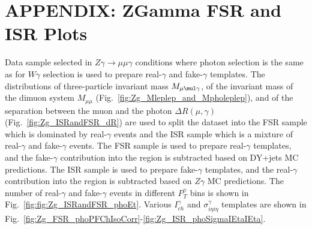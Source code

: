 \section{APPENDIX: ZGamma FSR and ISR Plots}
\label{sec:ZgFSRandISRplots}

Data sample selected in $Z\gamma\rightarrow\mu\mu\gamma$ conditions where photon selection is the same as for $W\gamma$ selection is used to prepare real-$\gamma$ and fake-$\gamma$ templates. The distributions of three-particle invariant mass $M_{\mu\mul\gamma}$, of the invariant mass of the dimuon system $M_{\mu\mu}$ (Fig.~\ref{fig:Zg_Mleplep_and_Mpholeplep}), and of the separation between the muon and the photon $\Delta R(\mu,\gamma)$ (Fig.~\ref{fig:Zg_ISRandFSR_dR}) are used to split the dataset into the FSR sample which is dominated by real-$\gamma$ events and the ISR sample which is a mixture of real-$\gamma$ and fake-$\gamma$ events. The FSR sample is used to prepare real-$\gamma$ templates, and the fake-$\gamma$ contribution into the region is subtracted based on DY+jets MC predictions. The ISR sample is used to prepare fake-$\gamma$ templates, and the real-$\gamma$ contribution into the region is subtracted based on $Z\gamma$ MC predictions. The number of real-$\gamma$ and fake-$\gamma$ events in different $P_T^\gamma$ bins is shown in Fig.~\ref{fig:fig:Zg_ISRandFSR_phoEt}. Various $I_{ch}^\gamma$ and $\sigma_{i \eta i \eta}^\gamma$ templates are shown in Fig.~\ref{fig:Zg_FSR_phoPFChIsoCorr}-\ref{fig:Zg_ISR_phoSigmaIEtaIEta}.

